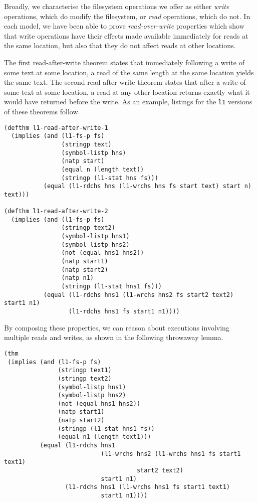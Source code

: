 \documentclass[runningheads,a4paper]{llncs}
\begin{document}
Broadly, we characterise the filesystem
operations we offer as either \textit{write} operations, which do
modify the filesystem, or \textit{read} operations, which do not. In
each model, we have been able to prove \textit{read-over-write}
properties which show that write operations have
their effects made available immediately for reads at the same
location, but also that they do not affect reads at other locations.

The first read-after-write theorem states that immediately following a
write of some text at some location, a read of the same length at the
same location yields the same text. The second read-after-write
theorem states that after a write of some text at some location, a
read at any other location returns exactly what it would have returned
before the write. As an example, listings for the \texttt{l1} versions
of these theorems follow.

\medskip

\noindent
\begin{verbatim}
(defthm l1-read-after-write-1
  (implies (and (l1-fs-p fs)
                (stringp text)
                (symbol-listp hns)
                (natp start)
                (equal n (length text))
                (stringp (l1-stat hns fs)))
           (equal (l1-rdchs hns (l1-wrchs hns fs start text) start n) text)))

(defthm l1-read-after-write-2
  (implies (and (l1-fs-p fs)
                (stringp text2)
                (symbol-listp hns1)
                (symbol-listp hns2)
                (not (equal hns1 hns2))
                (natp start1)
                (natp start2)
                (natp n1)
                (stringp (l1-stat hns1 fs)))
           (equal (l1-rdchs hns1 (l1-wrchs hns2 fs start2 text2) start1 n1)
                  (l1-rdchs hns1 fs start1 n1))))
\end{verbatim}

By composing these properties, we can reason about executions
involving multiple reads and writes, as shown in the following
throwaway lemma.

\medskip

\noindent
\begin{verbatim}
(thm
 (implies (and (l1-fs-p fs)
               (stringp text1)
               (stringp text2)
               (symbol-listp hns1)
               (symbol-listp hns2)
               (not (equal hns1 hns2))
               (natp start1)
               (natp start2)
               (stringp (l1-stat hns1 fs))
               (equal n1 (length text1)))
          (equal (l1-rdchs hns1
                           (l1-wrchs hns2 (l1-wrchs hns1 fs start1 text1)
                                     start2 text2)
                           start1 n1)
                 (l1-rdchs hns1 (l1-wrchs hns1 fs start1 text1)
                           start1 n1))))
\end{verbatim}
\end{document}
